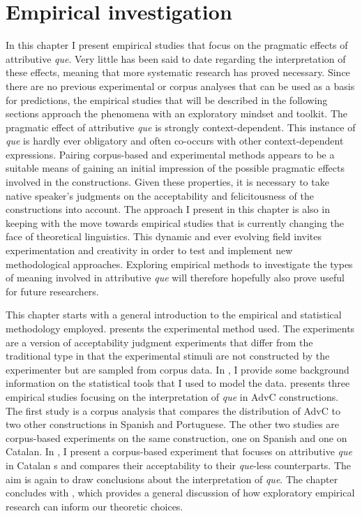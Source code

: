 \chapter{Empirical investigation}\label{sec:experiments}
In this chapter I present empirical studies that focus on   the pragmatic effects of attributive \emph{que}. Very little has been said to date regarding the interpretation of these effects, meaning that more systematic research has proved necessary. Since there are no previous  experimental or corpus analyses that can be used as a basis for predictions,  the empirical studies that will be described in the following sections approach the phenomena with an exploratory mindset and toolkit. The  pragmatic effect of attributive \emph{que} is  strongly context-dependent. This instance of \emph{que} is hardly ever obligatory and often co-occurs with other context-dependent expressions.  Pairing corpus-based and experimental methods appears to be a suitable means of gaining an initial impression of the possible pragmatic effects involved in the constructions. Given these properties, it is necessary to take  native speaker's judgments on the acceptability and felicitousness of the constructions into account.  The approach I present in this chapter is also in keeping with the move towards empirical studies  that is currently changing the face of theoretical linguistics. This  dynamic and ever evolving field  invites experimentation and creativity in order to  test and implement  new methodological approaches. Exploring empirical methods to investigate the types of meaning involved in attributive \emph{que} will therefore hopefully also prove useful for future researchers.

This chapter starts with a general introduction to the empirical and statistical methodology employed.  presents the experimental method used. The experiments are a version of acceptability judgment experiments that differ from the traditional type in that the experimental stimuli are not constructed by the experimenter but are sampled from corpus data. In , I provide some background information on the statistical tools that I used to model the data.  presents three empirical studies focusing on the interpretation of \emph{que} in AdvC constructions. The first study is a corpus analysis that compares the distribution of AdvC to two other constructions in Spanish and Portuguese. The other two studies are corpus-based experiments on the same construction, one on Spanish and one on Catalan.  In , I present a corpus-based experiment that focuses on attributive \emph{que} in Catalan s and compares their acceptability to their \emph{que}-less counterparts. The aim is again to draw conclusions about the interpretation of \emph{que}. The chapter concludes with , which provides a general discussion of how exploratory empirical research can inform our theoretic choices.

